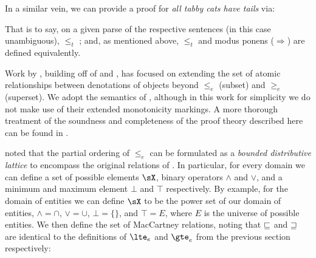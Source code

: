 \documentclass[11pt,a4paper]{article}
\begin{document}
\begin{prooftree}
\end{prooftree}

In a similar vein, we can provide a proof for \textit{all tabby cats
  have tails} via:

\begin{prooftree}
\end{prooftree}

That is to say, on a given parse of the respective sentences (in this
  case unambiguous),
   $\leq_t$ ;
  and, as mentioned above, $\leq_t$ and modus ponens ($\Rightarrow$)
  are defined equivalently.


Work by \citet{key:2009maccartney-natlog}, building off of
  \citet{2007maccartney-natlog} and
  \citet{key:2008maccartney-natlog},
  has focused on extending the set of atomic relationships between
  denotations of objects beyond $\leq_e$ (subset) and $\geq_e$ (superset).
We adopt the semantics of \citet{key:2012icard-natlog}, although in this
  work for simplicity we do not make use of their extended
  monotonicity markings.
A more thorough treatment of the soundness and completeness of the
  proof theory described here can be found in
  \citet{key:2013djalali-natlog}.

\citet{key:2014icard-natlog} noted that the partial ordering of
  $\leq_e$ can be formulated as a \textit{bounded distributive
  lattice} to encompass the original relations of
  \citet{key:2007maccartney-natlog}.
In particular, for every domain we can define a set of possible 
  elements $\sX$, binary operators $\land$ and $\lor$,
  and a minimum and maximum element $\bot$ and $\top$ respectively.
By example, for the domain of entities we can define $\sX$ to be
  the power set of our domain of entities, $\land=\cap$,
  $\lor=\cup$, $\bot=\{\}$, and $\top=E$, where $E$ is the universe
  of possible entities.
We then define the set of MacCartney relations, noting that
  $\forward$ and $\reverse$ are identical to the definitions of
  $\lte_e$ and $\gte_e$ from the previous section respectively:
\end{document}
